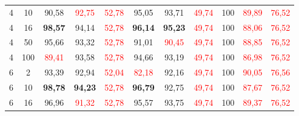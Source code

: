 \begin{table}[ht]
\begin{tabular}{cc|ccc|ccc|ccc}
        {4}                           & {10}    & {90,58}                             & \textcolor{red}{92,75}              & \textcolor{red}{52,78}                   & {95,05}                         & {93,71}                         & \textcolor{red}{49,74}         & {100}                           & \textcolor{red}{89,89}          & \textcolor{red}{76,52}         \\
        {4}                           & {16}    & \textbf{98,57}                      & {94,14}                             & \textcolor{red}{52,78}                   & \textbf{96,14}                  & \textbf{95,23}                  & \textcolor{red}{49,74}         & {100}                           & \textcolor{red}{88,06}          & \textcolor{red}{76,52}         \\
        {4}                           & {50}    & {95,66}                             & {93,32}                             & \textcolor{red}{52,78}                   & {91,01}                         & \textcolor{red}{90,45}          & \textcolor{red}{49,74}         & {100}                           & \textcolor{red}{88,85}          & \textcolor{red}{76,52}         \\
        {4}                           & {100}   & \textcolor{red}{89,41}              & {93,58}                             & \textcolor{red}{52,78}                   & {94,66}                         & {93,19}                         & \textcolor{red}{49,74}         & {100}                           & \textcolor{red}{86,98}          & \textcolor{red}{76,52}         \\
        {6}                           & {2}     & {93,39}                             & {92,94}                             & \textcolor{red}{52,04}                   & \textcolor{red}{82,18}          & {92,16}                         & \textcolor{red}{49,74}         & {100}                           & \textcolor{red}{90,05}          & \textcolor{red}{76,56}         \\
        {6}                           & {10}    & \textbf{98,78}                      & \textbf{94,23}                      & \textcolor{red}{52,78}                   & \textbf{96,79}                  & {92,75}                         & \textcolor{red}{49,74}         & {100}                           & \textcolor{red}{87,67}          & \textcolor{red}{76,52}         \\
        {6}                           & {16}    & {96,96}                             & \textcolor{red}{91,32}              & \textcolor{red}{52,78}                   & {95,57}                         & {93,75}                         & \textcolor{red}{49,74}         & {100}                           & \textcolor{red}{89,37}          & \textcolor{red}{76,52}         \\

\end{tabular}
\end{table}
